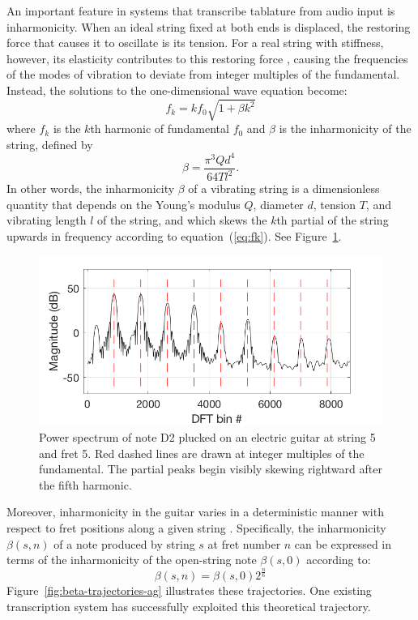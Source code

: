 \documentclass[convention,peer-reviewed]{aesconf}
\begin{document}
An important feature in systems that transcribe tablature from audio input is inharmonicity. When an ideal string fixed at both ends is displaced, the restoring force that causes it to oscillate is its tension. For a real string with stiffness, however, its elasticity contributes to this restoring force \citep{fletcher1962}, causing the frequencies of the modes of vibration to deviate from integer multiples of the fundamental. Instead, the solutions to the one-dimensional wave equation become: 
\begin{equation}
\label{eq:fk}
f_k = kf_{0}\sqrt{1+\beta k^2}
\end{equation}
where $f_k$ is the $k$th harmonic of fundamental $f_0$ and $\beta$ is the inharmonicity of the string, defined by
\begin{equation}
\beta = \frac{\pi^3 Q d^4}{64 T l^2}. \label{eq:beta}
\end{equation}
In other words, the inharmonicity $\beta$ of a vibrating string is a dimensionless quantity that depends on the Young's modulus $Q$, diameter $d$, tension $T$, and vibrating length $l$ of the string, and which skews the $k$th partial of the string upwards in frequency according to equation~(\ref{eq:fk}). See Figure~\ref{fig:skew}. 

\begin{figure}[!htbp]
\centering
\includegraphics[scale=0.3]{skew}
\caption{Power spectrum of note D2 plucked on an electric guitar at string 5 and fret 5. Red dashed lines are drawn at integer multiples of the fundamental. The partial peaks begin visibly skewing rightward after the fifth harmonic.}
\label{fig:skew}
\end{figure}

Moreover, inharmonicity in the guitar varies in a deterministic manner with respect to fret positions along a given string \citep{barbanchoi2012}. Specifically, the inharmonicity $\beta(s,n)$ of a note produced by string $s$ at fret number $n$ can be expressed in terms of the inharmonicity of the open-string note $\beta(s,0)$ according to:
\begin{equation} 
\label{eq:beta-traj}
\beta(s,n) = \beta(s,0)2^{\frac{n}{6}}
\end{equation}
Figure~\ref{fig:beta-trajectories-ag} illustrates these trajectories. One existing transcription system \citep{barbanchoi2012} has successfully exploited this theoretical trajectory.
\end{document}
